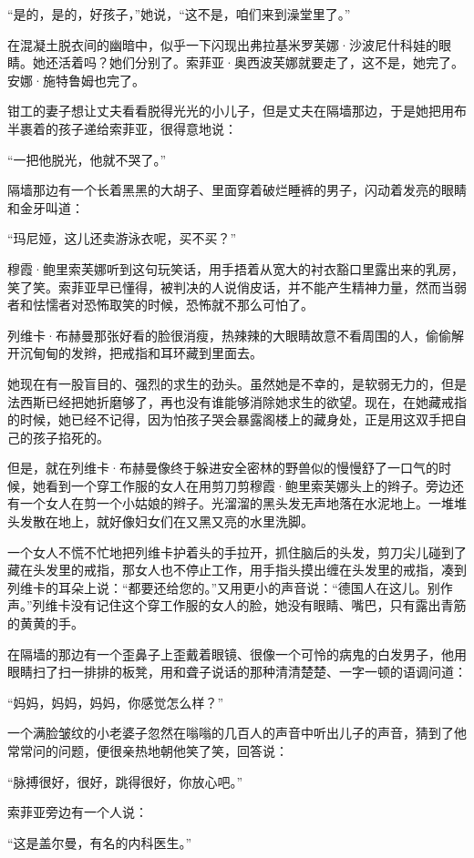 “是的，是的，好孩子，”她说，“这不是，咱们来到澡堂里了。”

在混凝土脱衣间的幽暗中，似乎一下闪现出弗拉基米罗芙娜·沙波尼什科娃的眼睛。她还活着吗？她们分别了。索菲亚·奥西波芙娜就要走了，这不是，她完了。安娜·施特鲁姆也完了。

钳工的妻子想让丈夫看看脱得光光的小儿子，但是丈夫在隔墙那边，于是她把用布半裹着的孩子递给索菲亚，很得意地说：

“一把他脱光，他就不哭了。”

隔墙那边有一个长着黑黑的大胡子、里面穿着破烂睡裤的男子，闪动着发亮的眼睛和金牙叫道：

“玛尼娅，这儿还卖游泳衣呢，买不买？”

穆霞·鲍里索芙娜听到这句玩笑话，用手捂着从宽大的衬衣豁口里露出来的乳房，笑了笑。索菲亚早已懂得，被判决的人说俏皮话，并不能产生精神力量，然而当弱者和怯懦者对恐怖取笑的时候，恐怖就不那么可怕了。

列维卡·布赫曼那张好看的脸很消瘦，热辣辣的大眼睛故意不看周围的人，偷偷解开沉甸甸的发辫，把戒指和耳环藏到里面去。

她现在有一股盲目的、强烈的求生的劲头。虽然她是不幸的，是软弱无力的，但是法西斯已经把她折磨够了，再也没有谁能够消除她求生的欲望。现在，在她藏戒指的时候，她已经不记得，因为怕孩子哭会暴露阁楼上的藏身处，正是用这双手把自己的孩子掐死的。

但是，就在列维卡·布赫曼像终于躲进安全密林的野兽似的慢慢舒了一口气的时候，她看到一个穿工作服的女人在用剪刀剪穆霞·鲍里索芙娜头上的辫子。旁边还有一个女人在剪一个小姑娘的辫子。光溜溜的黑头发无声地落在水泥地上。一堆堆头发散在地上，就好像妇女们在又黑又亮的水里洗脚。

一个女人不慌不忙地把列维卡护着头的手拉开，抓住脑后的头发，剪刀尖儿碰到了藏在头发里的戒指，那女人也不停止工作，用手指头摸出缠在头发里的戒指，凑到列维卡的耳朵上说：“都要还给您的。”又用更小的声音说：“德国人在这儿。别作声。”列维卡没有记住这个穿工作服的女人的脸，她没有眼睛、嘴巴，只有露出青筋的黄黄的手。

在隔墙的那边有一个歪鼻子上歪戴着眼镜、很像一个可怜的病鬼的白发男子，他用眼睛扫了扫一排排的板凳，用和聋子说话的那种清清楚楚、一字一顿的语调问道：

“妈妈，妈妈，妈妈，你感觉怎么样？”

一个满脸皱纹的小老婆子忽然在嗡嗡的几百人的声音中听出儿子的声音，猜到了他常常问的问题，便很亲热地朝他笑了笑，回答说：

“脉搏很好，很好，跳得很好，你放心吧。”

索菲亚旁边有一个人说：

“这是盖尔曼，有名的内科医生。”

